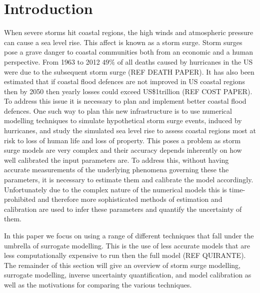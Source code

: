 \documentclass[12pt,a4paper]{article}
\begin{document}
\section{Introduction}
\noindent
When severe storms hit coastal regions, the high winds and atmospheric pressure can cause a sea level rise. This affect is known as a storm surge. Storm surges pose a grave danger to coastal communities both from an economic and a human perspective. From 1963 to 2012 $49\%$ of all deaths caused by hurricanes in the US were due to the subsequent storm surge (REF DEATH PAPER). It has also been estimated that if coastal flood defences are not improved in US coastal regions then by 2050 then yearly losses could exceed US\$1trillion (REF COST PAPER).  To address this issue it is necessary to plan and implement better coastal flood defences. One such way to plan this new infrastructure is to use numerical modelling techniques to simulate hypothetical storm surge events, induced by hurricanes, and study the simulated sea level rise to assess coastal regions most at risk to loss of human life and loss of property. This poses a problem as storm surge models are very complex and their accuracy depends inherently on how well calibrated the input parameters are. To address this, without having accurate measurements of the underlying phenomena governing these the parameters, it is necessary to estimate them and calibrate the model accordingly. Unfortunately due to the complex nature of the numerical models this is time-prohibited and therefore more sophisticated methods of estimation and calibration are used to infer these parameters and quantify the uncertainty of them.

In this paper we focus on using a range of different techniques that fall under the umbrella of surrogate modelling. This is the use of less accurate models that are less computationally expensive to run then the full model (REF QUIRANTE). The remainder of this section will give an overview of storm surge modelling, surrogate modelling, inverse uncertainty quantification, and model calibration as well as the motivations for comparing the various techniques.
\end{document}

